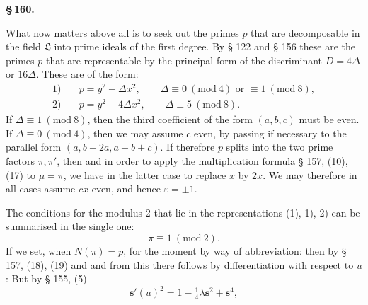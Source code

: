 \begin{center}
\textbf{\S\,160.\qquad {}}
\end{center}

What now matters above all is to seek out the primes $p$ that are decomposable in the field $\mathfrak{L}$ into prime ideals of the first degree. By § 122 and § 156 these are the primes $p$ that are representable by the principal form of the discriminant $D = 4\Delta$ or $16\Delta$. These are of the form:
\[
\begin{aligned}
1) \quad & p = y^2 - \Delta x^2, \qquad \Delta \equiv 0 \ (\mathrm{mod}\ 4) \text{ or } \equiv 1 \ (\mathrm{mod}\ 8),\\
2) \quad & p = y^2 - 4\Delta x^2, \qquad \Delta \equiv 5 \ (\mathrm{mod}\ 8).
\end{aligned}
\]
If $\Delta \equiv 1 \ (\mathrm{mod}\ 8)$, then the third coefficient of the form $(a, b, c)$ must be even. If $\Delta \equiv 0 \ (\mathrm{mod}\ 4)$, then we may assume $c$ even, by passing if necessary to the parallel form $(a, b+2a, a+b+c)$. If therefore $p$ splits into the two prime factors $\pi, \pi'$, then
and in order to apply the multiplication formula § 157, (10), (17) to $\mu = \pi$, we have in the latter case to replace $x$ by $2x$. We may therefore in all cases assume $cx$ even, and hence $\varepsilon = \pm 1$.

The conditions for the modulus 2 that lie in the representations (1), 1), 2) can be summarised in the single one:
\[
\pi \equiv 1 \ (\mathrm{mod}\ 2).
\]
If we set, when $N(\pi) = p$, for the moment by way of abbreviation:
then by § 157, (18), (19)
and
and from this there follows by differentiation with respect to $u$:
But by § 155, (5)
\[
\boldsymbol{s}'(u)^2 = 1 - \tfrac{1}{4}\lambda \boldsymbol{s}^2 + \boldsymbol{s}^4,
\]
